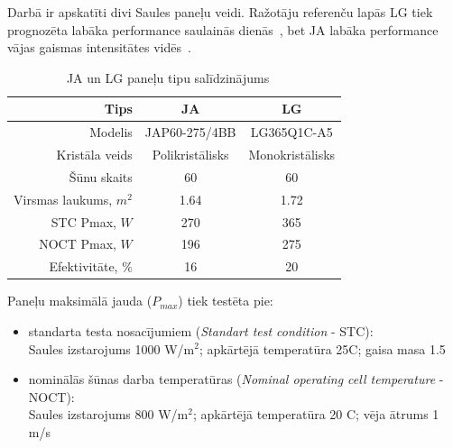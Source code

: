 Darbā ir apskatīti divi Saules paneļu veidi. Ražotāju referenču lapās LG tiek prognozēta labāka performance saulainās dienās~\cite{LGtips}, bet JA labāka performance vājas gaismas intensitātes vidēs~\cite{JAtips}.

\begin{table}[h]
    \caption{JA un LG paneļu tipu salīdzinājums~\cite{JAtips}~\cite{LGtips}} %
    \begin{center}
    \begin{tabular}{| r | c | c |}
    \hline
    Tips & JA & LG \\ \hline
    Modelis &  JAP60-275/4BB & LG365Q1C-A5\\ \hline
	Kristāla veids & Polikristālisks & Monokristālisks \\ \hline
	Šūnu skaits  &60  &60 \\ \hline
	Virsmas laukums, $m^2$ &1.64  &1.72 \\ \hline
	STC Pmax, $W$ 	&270 &365\\ \hline
	NOCT Pmax, $W$  &196 &275\\ \hline
	Efektivitāte, \% &16 & 20\\ \hline
    \end{tabular}
    \end{center}
    \label{tab:ja_lg_tipi}
\end{table}

Paneļu maksimālā jauda ($P_{max}$) tiek testēta pie:
\begin{itemize}
\item standarta testa nosacījumiem (\textit{Standart test condition} - STC):\\
Saules izstarojums 1000 W/m$^2$; apkārtējā temperatūra 25\textdegree C; gaisa masa 1.5
\item nominālās šūnas darba temperatūras (\textit{Nominal operating cell temperature} - NOCT):\\
Saules izstarojums 800 W/m$^2$; apkārtējā temperatūra 20 \textdegree C; vēja ātrums 1 m/s
\end{itemize}


